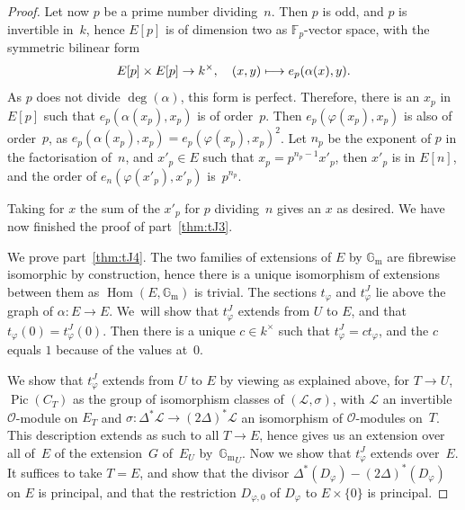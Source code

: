 \documentclass[11pt]{article}
\providecommand{\G}{}
\let\mathcal\mathscr
\def\mto{\mathchoice{\longmapsto}{\mapsto}{\mapsto}{\mapsto}}
\theoremstyle{plain}
\theoremstyle{definition}
\numberwithin{equation}{subsection}
\let\phi\varphi
\newcommand{\F}{\mathbb F}
\renewcommand{\G}{\mathbb G}
\newcommand{\calL}{\mathcal{L}}
\newcommand{\calO}{\mathcal{O}}
\newcommand{\Gm}{\G_{\mathrm{m}}}
\DeclareMathOperator{\Hom}{Hom}
\DeclareMathOperator{\Pic}{Pic}
\begin{document}
\begin{proof}
Let now $p$ be a prime number dividing~$n$. Then $p$ is odd, and $p$
is invertible in~$k$, hence $E[p]$ is of dimension two as
$\F_p$-vector space, with the symmetric bilinear form\enlargethispage{-\baselineskip}
\[
E[p]\times E[p] \to k^\times,\quad (x,y)\mto e_p(\alpha(x),y).
\]
As $p$ does not divide $\deg(\alpha)$, this form is
perfect. Therefore, there is an $x_p$ in $E[p]$ such that
$e_p(\alpha(x_p),x_p)$ is of order~$p$. Then $e_p(\phi(x_p),x_p)$ is
also of order~$p$, as $e_p(\alpha(x_p),x_p)=e_p(\phi(x_p),x_p)^2$. Let
$n_p$ be the exponent of $p$ in the factorisation of~$n$, and
$x'_p\in E$ such that $x_p=p^{n_p-1}x'_p$, then $x'_p$ is in $E[n]$,
and the order of $e_n(\phi(x'_p),x'_p)$ is~$p^{n_p}$.

Taking for $x$ the sum of the $x'_p$ for $p$ dividing~$n$ gives an $x$
as desired. We have now finished the proof of part~\eqref{thm:tJ3}.

We prove part~\eqref{thm:tJ4}. The two families of extensions of $E$ by $\Gm$ are
fibrewise isomorphic by construction, hence there is a unique
isomorphism of extensions between them as $\Hom(E,\Gm)$ is
trivial. The sections $t_\phi$ and $t^J_\phi$ lie above the graph of
$\alpha\colon E\to E$. We~will show that $t^J_\phi$ extends from $U$
to $E$, and that $t_\phi(0)=t^J_\phi(0)$. Then there is a unique $c\in
k^\times$ such that $t^J_\phi=ct_\phi$, and the $c$ equals $1$ because
of the values at~$0$.

We show that $t^J_\phi$ extends from $U$ to $E$ by viewing as
explained above, for $T\to U$, $\Pic(C_T)$ as the group of isomorphism
classes of $(\calL,\sigma)$, with $\calL$ an invertible $\calO$\nobreakdash-module
on $E_T$ and $\sigma\colon \Delta^*\calL\to (2\Delta)^*\calL$ an
isomorphism of $\calO$-modules on~$T$. This description extends as
such to all $T\to E$, hence gives us an extension over all of~$E$ of
the extension~$G$ of~$E_U$ by~${\Gm}_U$. Now we show that
$t^J_\phi$ extends over~$E$. It suffices to take $T=E$, and show that
the divisor $\Delta^*(D_\phi)-(2\Delta)^*(D_\phi)$ on $E$ is principal,
and that the restriction $D_{\phi,0}$ of $D_\phi$ to $E\times\{0\}$ is
principal.


\end{proof}
\end{document}
